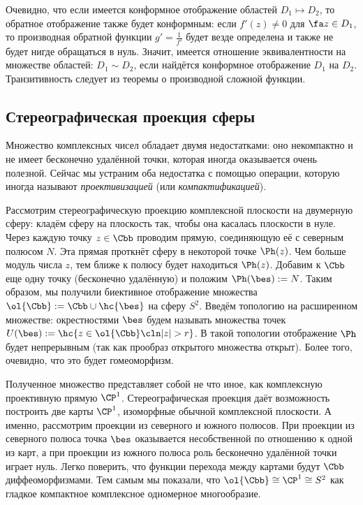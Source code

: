 \documentclass[a4paper]{article}
\begin{document}
Очевидно, что если имеется конформное отображение областей $D_1 \mapsto D_2$, то обратное отображение
также будет конформным: если $f'(z) \neq 0$ для $\fa z \in D_1$, то производная обратной функции
$g' =\frac{1}{f'}$ будет везде определена и также не будет нигде обращаться в нуль.
Значит, имеется отношение эквивалентности на множестве областей: $D_1 \sim D_2$, если найдётся конформное
отображение $D_1$ на $D_2$. Транзитивность следует из теоремы о производной сложной функции.

\subsection{Стереографическая проекция сферы}

Множество комплексных чисел обладает двумя недостатками: оно некомпактно и не имеет бесконечно удалённой
точки, которая иногда оказывается очень полезной. Сейчас мы устраним оба недостатка с помощью
операции, которую иногда называют \emph{проективизацией} (или \emph{компактификацией}).

Рассмотрим стереографическую проекцию комплексной плоскости на двумерную сферу: кладём сферу на плоскость так,
чтобы она касалась плоскости в нуле. Через каждую точку $z\in \Cbb$ проводим прямую, соединяющую её с
северным полюсом $N$. Эта прямая проткнёт сферу в некоторой точке $\Ph(z)$. Чем больше модуль числа $z$, тем
ближе к полюсу будет находиться $\Ph(z)$. Добавим к $\Cbb$ еще одну точку (бесконечно удалённую) и положим
$\Ph(\bes) := N$. Таким образом, мы получили биективное отображение множества
$\ol{\Cbb} := \Cbb \cup \hc{\bes}$ на сферу $S^2$. Введём топологию на расширенном множестве: окрестностями $\bes$
будем называть множества точек $U(\bes) := \hc{z \in \ol{\Cbb} \cln |z| > r}$. В такой топологии отображение $\Ph$
будет непрерывным (так как прообраз открытого множества открыт). Более того, очевидно, что это будет гомеоморфизм.

Полученное множество представляет собой не что иное, как комплексную проективную прямую $\CP^1$. Стереографическая
проекция даёт возможность построить две карты $\CP^1$, изоморфные обычной комплексной плоскости. А именно, рассмотрим
проекции из северного и южного полюсов. При проекции из северного полюса точка $\bes$ оказывается несобственной
по отношению к одной из карт, а при проекции из южного полюса роль бесконечно удалённой точки играет нуль.
Легко поверить, что функции перехода между картами будут $\Cbb$\д диффеоморфизмами. Тем самым мы показали, что $\ol{\Cbb} \cong \CP^1 \cong S^2$
как гладкое компактное комплексное одномерное многообразие.
\end{document}
